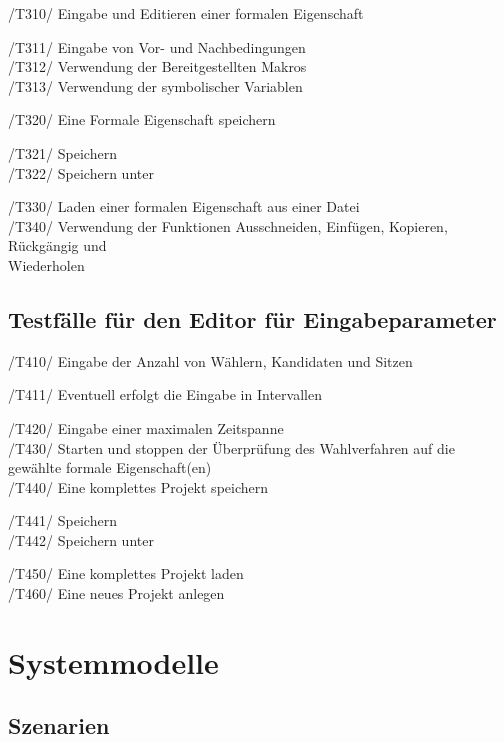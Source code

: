 \documentclass[a4paper]{scrreprt}
\begin{document}
/T310/ Eingabe und Editieren einer formalen Eigenschaft 
\begin{addmargin}[25pt]{0pt}
/T311/ Eingabe von Vor- und Nachbedingungen \\
/T312/ Verwendung der Bereitgestellten Makros \\
/T313/ Verwendung der symbolischer Variablen 
\end{addmargin}	
/T320/ Eine Formale Eigenschaft speichern
\begin{addmargin}[25pt]{0pt}
/T321/ Speichern \\
/T322/ Speichern unter 
\end{addmargin}	
/T330/ Laden einer formalen Eigenschaft aus einer Datei \\
/T340/ Verwendung der Funktionen Ausschneiden, Einfügen, Kopieren, Rückgängig und \\ Wiederholen
\section{Testfälle für den Editor für Eingabeparameter}

/T410/ Eingabe der Anzahl von Wählern, Kandidaten und Sitzen
\begin{addmargin}[25pt]{0pt}
/T411/ Eventuell erfolgt die Eingabe in Intervallen
\end{addmargin}	
/T420/ Eingabe einer maximalen Zeitspanne \\
/T430/ Starten und stoppen der Überprüfung des Wahlverfahren auf die gewählte formale Eigenschaft(en) \\
/T440/ Eine komplettes Projekt speichern 
\begin{addmargin}[25pt]{0pt}
/T441/ Speichern \\
/T442/ Speichern unter 
\end{addmargin}
/T450/ Eine komplettes Projekt laden \\
/T460/ Eine neues Projekt anlegen \\


\chapter{Systemmodelle}
\section{Szenarien}
\end{document}
